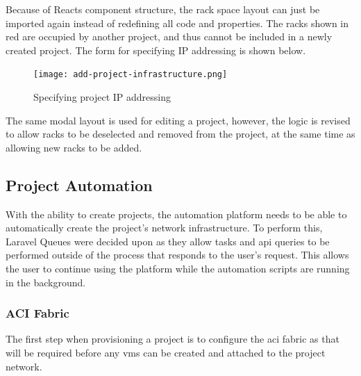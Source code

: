 Because of Reacts component structure, the rack space layout can just be imported again instead of redefining all code and properties. The racks shown in red are occupied by another project, and thus cannot be included in a newly created project. The form for specifying IP addressing is shown below.

\begin{figure}[H]
    \centering
    \texttt{[image: add-project-infrastructure.png]}
    \caption{Specifying project IP addressing}
    \label{fig:add-project-infrastructure}
\end{figure}

The same modal layout is used for editing a project, however, the logic is revised to allow racks to be deselected and removed from the project, at the same time as allowing new racks to be added.

\subsection{Project Automation}
With the ability to create projects, the automation platform needs to be able to automatically create the project's network infrastructure. To perform this, Laravel Queues were decided upon as they allow tasks and \gls{api} queries to be performed outside of the process that responds to the user's request. This allows the user to continue using the platform while the automation scripts are running in the background.

\subsubsection{ACI Fabric}
The first step when provisioning a project is to configure the \gls{aci} fabric as that will be required before any \gls{vm}s can be created and attached to the project network.

